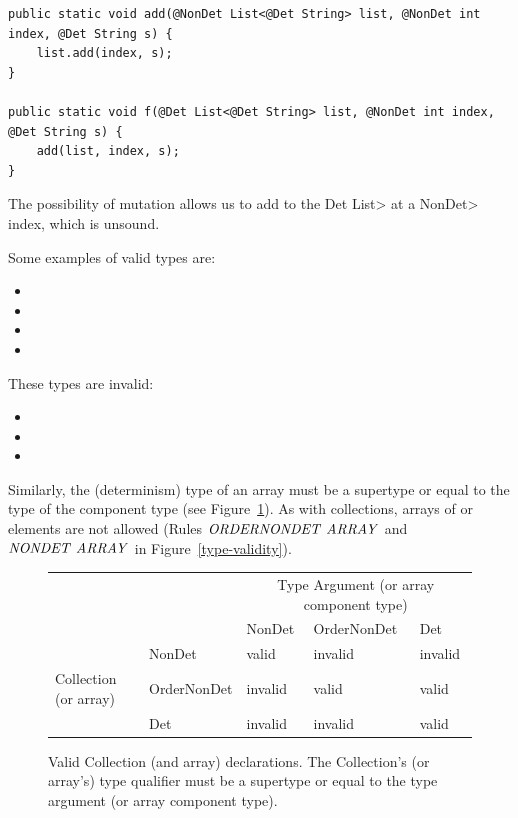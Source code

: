 \begin{verbatim}
public static void add(@NonDet List<@Det String> list, @NonDet int index, @Det String s) {
    list.add(index, s);
}

public static void f(@Det List<@Det String> list, @NonDet int index, @Det String s) {
    add(list, index, s);
}
\end{verbatim}

The possibility of mutation allows us to add to the \<Det List> at a
\<NonDet> index, which is unsound.


Some examples of valid types are:
\begin{itemize}
    \item {}
    \item {}
    \item {}
    \item {}
\end{itemize}

These types are invalid:
\begin{itemize}
    \item {}
    \item {}
    \item {}
\end{itemize}

Similarly, the (determinism) type of an array must be a supertype or equal to
the type of the component type (see Figure~\ref{fig-determinism-collections}).
As with collections,  arrays of  or 
elements are not allowed (Rules $\sc{\mathit{ORDERNONDET \ ARRAY}}$ and $\sc{\mathit{NONDET \ ARRAY}}$ in Figure~\ref{type-validity}).

\begin{figure}
    \centering
    \begin{tabular}{|l|l|l|l|l|}
        \cline{3-5}
        \multicolumn{2}{c|}{~}  &  \multicolumn{3}{c|}{Type Argument (or array component type)} \\ \cline{3-5}
        \multicolumn{2}{c|}{~}  & NonDet     & OrderNonDet & Det \\ \hline
        & NonDet      &   valid    &  invalid    & invalid  \\ \cline{2-5}
        Collection (or array)   & OrderNonDet &   invalid  &  valid      & valid  \\ \cline{2-5}
        & Det         &   invalid  &  invalid    & valid      \\ \hline
    \end{tabular}
    \caption{Valid Collection (and array) declarations.  The Collection's (or array's) type qualifier
        must be a supertype or equal to the type argument (or array component type).}
    \label{fig-determinism-collections}
\end{figure}

